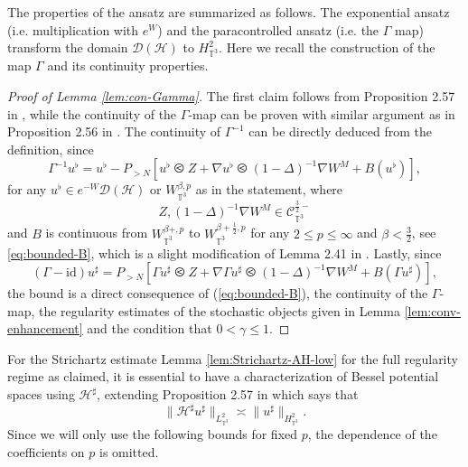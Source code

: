 The properties of the ansatz are summarized as follows. The exponential ansatz
(i.e. multiplication with $e^W$) and the paracontrolled ansatz (i.e. the
$\Gamma$ map) transform the domain $\mathcal{D} (\mathcal{H})$ to
$H_{\mathbb{T}^3}^2$. Here we recall the construction of the map $\Gamma$ and
its continuity properties.

\begin{proof}[Proof of Lemma \ref{lem:con-Gamma}]
  The first claim follows from Proposition 2.57 in {\cite{GUZ20}}, while the
  continuity of the $\Gamma$-map can be proven with similar argument as in
  Proposition 2.56 in {\cite{GUZ20}}. The continuity of $\Gamma^{- 1}$ can be
  directly deduced from the definition, since
  \[ \Gamma^{- 1} u^{\flat} = u^{\flat} - P_{> N} [u^{\flat} \olessthan Z +
     \nabla u^{\flat} \olessthan (1 - \Delta)^{- 1} \nabla W^M + B
     (u^{\flat})], \]
  for any $u^{\flat} \in e^{- W} \mathcal{D} (\mathcal{H})$ or
  $W_{\mathbb{T}^3}^{\beta, p}$ as in the statement, where
  \[ Z, (1 - \Delta)^{- 1} \nabla W^M \in
     \mathcal{C}_{\mathbb{T}^3}^{\frac{3}{2} -} \]
  and $B$ is continuous from ${W_{\mathbb{T}^3}^{\beta +, p}} $ to
  ${W_{\mathbb{T}^3}^{\beta + \frac{1}{2}, p}} $ for any $2 \leqslant p
  \leqslant \infty$ and $\beta < \frac{3}{2}$, see \eqref{eq:bounded-B}, which
  is a slight modification of Lemma 2.41 in {\cite{GUZ20}}. Lastly, since
  \[ (\Gamma - \mathrm{id}) u^{\sharp} = P_{> N} [\Gamma u^{\sharp} \olessthan
     Z + \nabla \Gamma u^{\sharp} \olessthan (1 - \Delta)^{- 1} \nabla W^M + B
     (\Gamma u^{\sharp})], \]
  the bound is a direct consequence of (\ref{eq:bounded-B}), the continuity of
  the $\Gamma$-map, the regularity estimates of the stochastic objects given
  in Lemma \ref{lem:conv-enhancement} and the condition that $0 < \gamma
  \leqslant 1$.
\end{proof}

For the Strichartz estimate Lemma \ref{lem:Strichartz-AH-low} for the full
regularity regime as claimed, it is essential to have a characterization of
Bessel potential spaces using $\mathcal{H}^{\sharp}$, extending Proposition
2.57 in {\cite{GUZ20}} which says that
\begin{equation}
  \| \mathcal{H}^{\sharp} u^{\sharp} \|_{L_{\mathbb{T}^3}^2} \asymp \|
  u^{\sharp} \|_{H_{\mathbb{T}^3}^2} . \label{eq:equiv-Sobolev-Hsharp-2}
\end{equation}
Since we will only use the following bounds for fixed $p$, the dependence of
the coefficients on $p$ is omitted.

